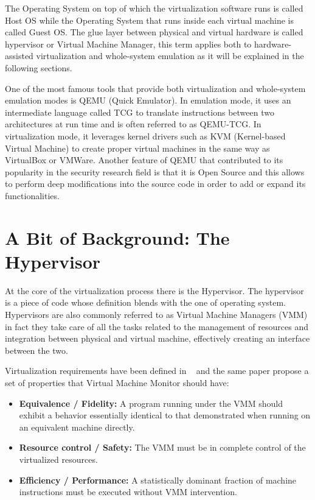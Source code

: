 The Operating System on top of which the virtualization software runs is called Host OS while the Operating System that runs inside each virtual machine is called Guest OS. The glue layer between physical and virtual hardware is called hypervisor or Virtual Machine Manager, this term applies both to hardware-assisted virtualization and whole-system emulation as it will be explained in the following sections.

One of the most famous tools that provide both virtualization and whole-system emulation modes is QEMU (Quick Emulator). In emulation mode, it uses an intermediate language called TCG to translate instructions between two architectures at run time and is often referred to as QEMU-TCG. In virtualization mode, it leverages kernel drivers such as KVM (Kernel-based Virtual Machine) to create proper virtual machines in the same way as VirtualBox or VMWare. Another feature of QEMU that contributed to its popularity in the security research field is that it is Open Source and this allows to perform deep modifications into the source code in order to add or expand its functionalities.

\section{A Bit of Background: The Hypervisor}

At the core of the virtualization process there is the Hypervisor. The hypervisor is a piece of code whose definition blends with the one of operating system. Hypervisors are also commonly referred to as Virtual Machine Managers (VMM) in fact they take care of all the tasks related to the management of resources and integration between physical and virtual machine, effectively creating an interface between the two.

Virtualization requirements have been defined in ~\cite{virtreq} and the same paper propose a set of properties that Virtual Machine Monitor should have:

\begin{itemize}
    \item \textbf{Equivalence / Fidelity:} A program running under the VMM should exhibit a behavior essentially identical to that demonstrated when running on an equivalent machine directly.
    \item \textbf{Resource control / Safety:} The VMM must be in complete control of the virtualized resources.
    \item \textbf{Efficiency / Performance:} A statistically dominant fraction of machine instructions must be executed without VMM intervention.
\end{itemize}

